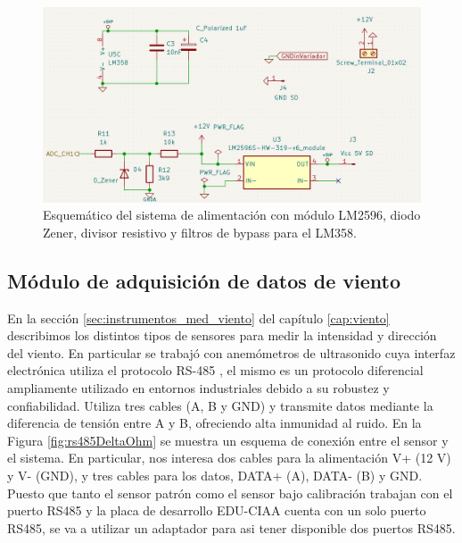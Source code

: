 \begin{figure}[H]
    \centering
    \includegraphics[width=0.9\linewidth]{Figuras/datalogger/Hardware/esquemPowerSupply.png}
    \caption{Esquemático del sistema de alimentación con módulo LM2596, diodo Zener, divisor resistivo y filtros de bypass para el LM358.}
    \label{fig:esquemPowerSupply}
\end{figure}

\subsection{Módulo de adquisición de datos de viento}\label{sec:moduloAdquisicionDatoViento}

En la sección \ref{sec:instrumentos_med_viento} del capítulo \ref{cap:viento} describimos los distintos tipos de sensores para medir la intensidad y dirección del viento. En particular se trabajó con anemómetros de ultrasonido cuya interfaz electrónica utiliza el protocolo RS-485 \cite{rs485Protocol}, el mismo es un protocolo diferencial ampliamente utilizado en entornos industriales debido a su robustez y confiabilidad. Utiliza tres cables (A, B y GND) y transmite datos mediante la diferencia de tensión entre A y B, ofreciendo alta inmunidad al ruido. En la Figura \ref{fig:rs485DeltaOhm} se muestra un esquema de conexión entre el sensor y el sistema. En particular, nos interesa dos cables para la alimentación V+ (12 \unit{\volt}) y V- (GND), y tres cables para los datos, DATA+ (A), DATA- (B) y GND. Puesto que tanto el sensor patrón como el sensor bajo calibración trabajan con el puerto RS485 y la placa de desarrollo EDU-CIAA cuenta con un solo puerto RS485, se va a utilizar un adaptador para asi tener disponible dos puertos RS485. 

